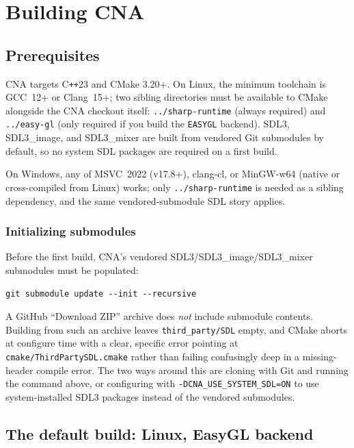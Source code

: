 \chapter{Building CNA}
\label{ch:building-cna}

\section{Prerequisites}

CNA targets C\texttt{++}23 and CMake 3.20+. On Linux, the minimum toolchain is GCC~12+ or
Clang~15+; two sibling directories must be available to CMake alongside the CNA checkout
itself: \texttt{../sharp-runtime} (always required) and \texttt{../easy-gl} (only required
if you build the \texttt{EASYGL} backend). SDL3, SDL3\_image, and SDL3\_mixer are built from
vendored Git submodules by default, so no system SDL packages are required on a first build.

On Windows, any of MSVC~2022 (v17.8+), clang-cl, or MinGW-w64 (native or cross-compiled from
Linux) works; only \texttt{../sharp-runtime} is needed as a sibling dependency, and the same
vendored-submodule SDL story applies.

\subsection{Initializing submodules}

Before the first build, CNA's vendored SDL3/SDL3\_image/SDL3\_mixer submodules must be
populated:

\begin{lstlisting}[style=cnashell]
git submodule update --init --recursive
\end{lstlisting}

A GitHub ``Download ZIP'' archive does \emph{not} include submodule contents. Building from
such an archive leaves \texttt{third\_party/SDL} empty, and CMake aborts at configure time
with a clear, specific error pointing at \texttt{cmake/ThirdPartySDL.cmake} rather than
failing confusingly deep in a missing-header compile error. The two ways around this are
cloning with Git and running the command above, or configuring with
\texttt{-DCNA\_USE\_SYSTEM\_SDL=ON} to use system-installed SDL3 packages instead of the
vendored submodules.

\section{The default build: Linux, EasyGL backend}

